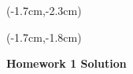 \documentclass[12pt, oneside]{article}
\begin{document}
\begin{textblock*}{4cm}(-1.7cm,-2.3cm)
\end{textblock*}

\begin{textblock*}{13.5cm}(-1.7cm,-1.8cm)
\end{textblock*}

\vspace{1cm}

\begin{center}
\textbf{\Large Homework 1 Solution}
\end{center}
\end{document}
